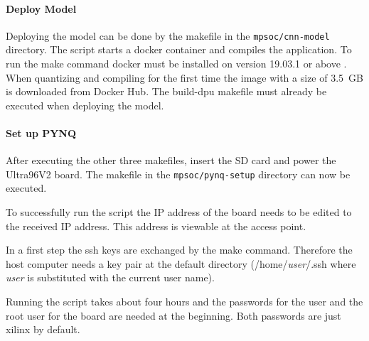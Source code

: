 \paragraph{Deploy Model}
Deploying the model can be done by the makefile in the \texttt{mpsoc/cnn-model} directory.
The script starts a docker container and compiles the application.
To run the make command docker must be installed on version 19.03.1 or above \cite{vitis_ai_user_guide}.
When quantizing and compiling for the first time the image with a size of \SI{3.5}{GB} is downloaded from Docker Hub.
The build-dpu makefile must already be executed when deploying the model.

\paragraph{Set up PYNQ}
After executing the other three makefiles, insert the SD card and power the Ultra96V2 board.
The makefile in the \texttt{mpsoc/pynq-setup} directory can now be executed.

To successfully run the script the IP address of the board needs to be edited to the received IP address.
This address is viewable at the access point.

In a first step the \acrshort{ssh} keys are exchanged by the make command.
Therefore the host computer needs a key pair at the default directory (/home/\textit{user}/.ssh where \textit{user} is substituted with the current user name).

Running the script takes about four hours and the passwords for the user and the root user for the board are needed at the beginning.
Both passwords are just xilinx by default.
